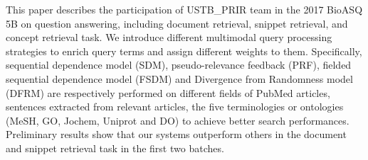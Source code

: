 This paper describes the participation of USTB\_PRIR team in the 2017 BioASQ 5B on question answering, including document retrieval, snippet retrieval, and concept retrieval task. We introduce different multimodal query processing strategies to enrich query terms and assign different weights to them. Specifically, sequential dependence model (SDM), pseudo-relevance feedback (PRF), fielded sequential dependence model (FSDM) and Divergence from Randomness model (DFRM) are respectively performed on different fields of PubMed articles, sentences extracted from relevant articles, the five terminologies or ontologies (MeSH, GO, Jochem, Uniprot and DO) to achieve better search performances. Preliminary results show that our systems outperform others in the document and snippet retrieval task in the first two batches.
